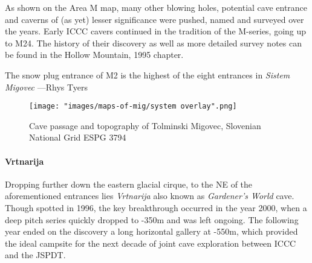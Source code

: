 As shown on the Area M map, many other blowing holes, potential cave entrance and caverns of (as yet) lesser significance were pushed, named and surveyed over the years. Early ICCC cavers continued in the tradition of the M-series, going up to M24. The history of their discovery as well as more detailed survey notes can be found in the Hollow Mountain, 1995 chapter.

\begin{marginfigure}
\checkoddpage \ifoddpage \forcerectofloat \else \forceversofloat \fi
\centering
 \caption{The snow plug entrance of M2 is the highest of the eight entrances in \emph{Sistem Migovec} ---Rhys Tyers}
 \label{surfaceM16}
\end{marginfigure}





 \begin{figure*}[t!]
 \checkoddpage \ifoddpage \forcerectofloat \else \forceversofloat \fi
\centering
  \texttt{[image: "images/maps-of-mig/system overlay".png]}
  \label{map m}
  \caption{Cave passage and topography of Tolminski Migovec, Slovenian National Grid ESPG 3794}
 \end{figure*}
\paragraph{Vrtnarija} Dropping further down the eastern glacial cirque, to the NE of the aforementioned entrances lies \emph{Vrtnarija} also known as  \emph{Gardener's World} cave. Though spotted in 1996, the key breakthrough occurred in the year 2000, when a deep pitch series quickly dropped to -350m and was left ongoing. The following year ended on the discovery a long horizontal gallery at -550m, which provided the ideal campsite for the next decade of joint cave exploration between ICCC and the JSPDT.

